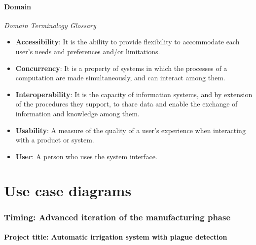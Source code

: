 \documentclass[11pt,a4paper]{article}
\begin{document}
\subsection{Domain}
\textit{Domain Terminology Glossary}\\
\begin{itemize}
\item \textbf{Accessibility}: It is the ability to provide flexibility to accommodate each user's needs and preferences and/or limitations.
\item \textbf{Concurrency}: It is a property of systems in which the processes of a computation are made simultaneously, and can interact among them.
\item \textbf{Interoperability}: It is the capacity of information systems, and by extension of the procedures they support, to share data and enable the exchange of information and knowledge among them.
\item \textbf{Usability}: A measure of the quality of a user's experience when interacting with a product or system.
\item \textbf{User}: A person who uses the system interface.
\end{itemize}

\part{Use case diagrams}
\section{Timing: Advanced iteration of the manufacturing phase}
\subsection*{Project title: Automatic irrigation system with plague detection}
\end{document}
